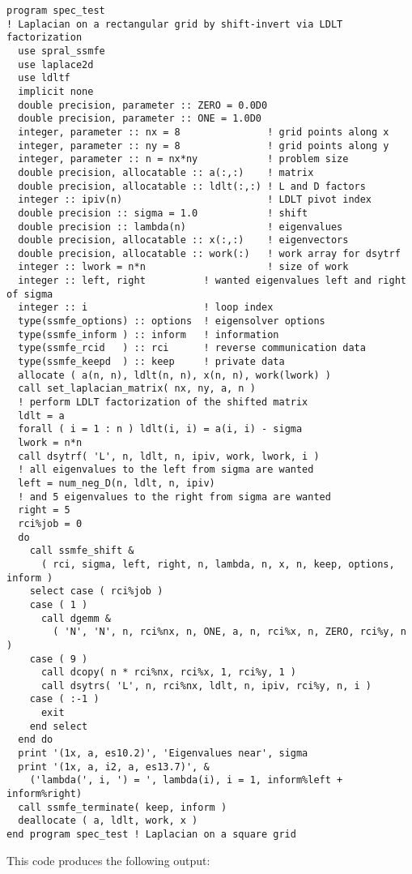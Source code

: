 \begin{verbatim}
program spec_test 
! Laplacian on a rectangular grid by shift-invert via LDLT factorization
  use spral_ssmfe
  use laplace2d
  use ldltf
  implicit none
  double precision, parameter :: ZERO = 0.0D0
  double precision, parameter :: ONE = 1.0D0
  integer, parameter :: nx = 8               ! grid points along x
  integer, parameter :: ny = 8               ! grid points along y
  integer, parameter :: n = nx*ny            ! problem size
  double precision, allocatable :: a(:,:)    ! matrix
  double precision, allocatable :: ldlt(:,:) ! L and D factors
  integer :: ipiv(n)                         ! LDLT pivot index
  double precision :: sigma = 1.0            ! shift
  double precision :: lambda(n)              ! eigenvalues
  double precision, allocatable :: x(:,:)    ! eigenvectors
  double precision, allocatable :: work(:)   ! work array for dsytrf
  integer :: lwork = n*n                     ! size of work
  integer :: left, right          ! wanted eigenvalues left and right of sigma
  integer :: i                    ! loop index
  type(ssmfe_options) :: options  ! eigensolver options
  type(ssmfe_inform ) :: inform   ! information
  type(ssmfe_rcid   ) :: rci      ! reverse communication data
  type(ssmfe_keepd  ) :: keep     ! private data
  allocate ( a(n, n), ldlt(n, n), x(n, n), work(lwork) )
  call set_laplacian_matrix( nx, ny, a, n )
  ! perform LDLT factorization of the shifted matrix
  ldlt = a
  forall ( i = 1 : n ) ldlt(i, i) = a(i, i) - sigma
  lwork = n*n
  call dsytrf( 'L', n, ldlt, n, ipiv, work, lwork, i )
  ! all eigenvalues to the left from sigma are wanted
  left = num_neg_D(n, ldlt, n, ipiv)
  ! and 5 eigenvalues to the right from sigma are wanted
  right = 5
  rci%job = 0
  do
    call ssmfe_shift &
      ( rci, sigma, left, right, n, lambda, n, x, n, keep, options, inform )
    select case ( rci%job )
    case ( 1 )
      call dgemm &
        ( 'N', 'N', n, rci%nx, n, ONE, a, n, rci%x, n, ZERO, rci%y, n )
    case ( 9 )
      call dcopy( n * rci%nx, rci%x, 1, rci%y, 1 )
      call dsytrs( 'L', n, rci%nx, ldlt, n, ipiv, rci%y, n, i )
    case ( :-1 )
      exit
    end select
  end do
  print '(1x, a, es10.2)', 'Eigenvalues near', sigma
  print '(1x, a, i2, a, es13.7)', &
    ('lambda(', i, ') = ', lambda(i), i = 1, inform%left + inform%right)
  call ssmfe_terminate( keep, inform )
  deallocate ( a, ldlt, work, x )
end program spec_test ! Laplacian on a square grid
\end{verbatim}

This code produces the following output:

